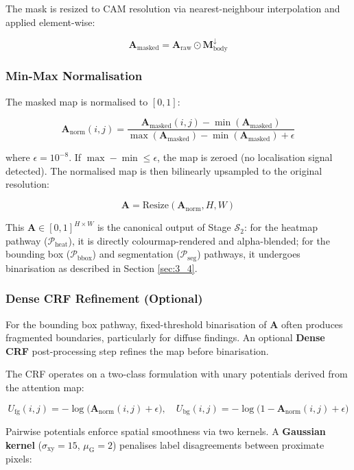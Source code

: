 The mask is resized to CAM resolution via nearest-neighbour interpolation and applied element-wise:

$$
\mathbf{A}_{\text{masked}} = \mathbf{A}_{\text{raw}} \odot \mathbf{M}_{\text{body}}^{\downarrow}
$$

\subsubsection{Min-Max Normalisation}

The masked map is normalised to $[0, 1]$:

$$
\mathbf{A}_{\text{norm}}(i,j) = \frac{\mathbf{A}_{\text{masked}}(i,j) - \min(\mathbf{A}_{\text{masked}})}{\max(\mathbf{A}_{\text{masked}}) - \min(\mathbf{A}_{\text{masked}}) + \epsilon}
$$

where $\epsilon = 10^{-8}$. If $\max - \min \leq \epsilon$, the map is zeroed (no localisation signal detected). The normalised map is then bilinearly upsampled to the original resolution:

$$
\mathbf{A} = \text{Resize}(\mathbf{A}_{\text{norm}}, H, W)
$$

This $\mathbf{A} \in [0, 1]^{H \times W}$ is the canonical output of Stage $\mathcal{S}_2$: for the heatmap pathway ($\mathcal{P}_{\text{heat}}$), it is directly colourmap-rendered and alpha-blended; for the bounding box ($\mathcal{P}_{\text{bbox}}$) and segmentation ($\mathcal{P}_{\text{seg}}$) pathways, it undergoes binarisation as described in Section \ref{sec:3_4}.

\subsubsection{Dense CRF Refinement (Optional)}


For the bounding box pathway, fixed-threshold binarisation of $\mathbf{A}$ often produces fragmented boundaries, particularly for diffuse findings. An optional \textbf{Dense CRF} post-processing step refines the map before binarisation.

The CRF operates on a two-class formulation with unary potentials derived from the attention map:

$$
U_{\text{fg}}(i,j) = -\log\!\bigl(\mathbf{A}_{\text{norm}}(i,j) + \epsilon\bigr), \quad U_{\text{bg}}(i,j) = -\log\!\bigl(1 - \mathbf{A}_{\text{norm}}(i,j) + \epsilon\bigr)
$$

Pairwise potentials enforce spatial smoothness via two kernels. A \textbf{Gaussian kernel} ($\sigma_{\text{xy}} = 15$, $\mu_{\text{G}} = 2$) penalises label disagreements between proximate pixels:

